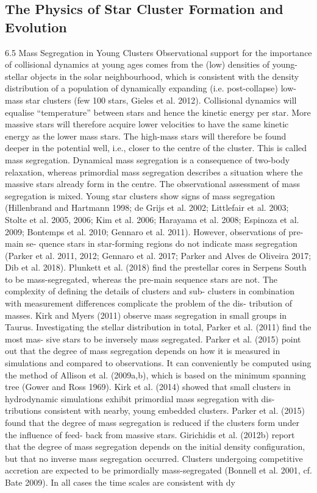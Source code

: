 \documentclass[../Main.tex]{subfiles}
\begin{document}
{\subsection{The Physics of Star Cluster Formation and Evolution}


6.5 Mass Segregation in Young Clusters
Observational support for the importance of collisional dynamics at young ages comes from
the (low) densities of young-stellar objects in the solar neighbourhood, which is consistent
with the density distribution of a population of dynamically expanding (i.e. post-collapse)
low-mass star clusters (few 100 stars, Gieles et al. 2012).
Collisional dynamics will equalise “temperature” between stars and hence the kinetic
energy per star. More massive stars will therefore acquire lower velocities to have the same
kinetic energy as the lower mass stars. The high-mass stars will therefore be found deeper
in the potential well, i.e., closer to the centre of the cluster. This is called mass segregation.
Dynamical mass segregation is a consequence of two-body relaxation, whereas primordial
mass segregation describes a situation where the massive stars already form in the centre.
The observational assessment of mass segregation is mixed. Young star clusters show
signs of mass segregation (Hillenbrand and Hartmann 1998; de Grijs et al. 2002; Littlefair
et al. 2003; Stolte et al. 2005, 2006; Kim et al. 2006; Harayama et al. 2008; Espinoza et al.
2009; Bontemps et al. 2010; Gennaro et al. 2011). However, observations of pre-main se-
quence stars in star-forming regions do not indicate mass segregation (Parker et al. 2011,
2012; Gennaro et al. 2017; Parker and Alves de Oliveira 2017; Dib et al. 2018). Plunkett
et al. (2018) find the prestellar cores in Serpens South to be mass-segregated, whereas the
pre-main sequence stars are not. The complexity of defining the details of clusters and sub-
clusters in combination with measurement differences complicate the problem of the dis-
tribution of masses. Kirk and Myers (2011) observe mass segregation in small groups in
Taurus. Investigating the stellar distribution in total, Parker et al. (2011) find the most mas-
sive stars to be inversely mass segregated.
Parker et al. (2015) point out that the degree of mass segregation depends on how it is
measured in simulations and compared to observations.
It can conveniently be computed using the method of Allison et al. (2009a,b), which is
based on the minimum spanning tree (Gower and Ross 1969). Kirk et al. (2014) showed that
small clusters in hydrodynamic simulations exhibit primordial mass segregation with dis-
tributions consistent with nearby, young embedded clusters. Parker et al. (2015) found that
the degree of mass segregation is reduced if the clusters form under the influence of feed-
back from massive stars. Girichidis et al. (2012b) report that the degree of mass segregation
depends on the initial density configuration, but that no inverse mass segregation occurred.
Clusters undergoing competitive accretion are expected to be primordially mass-segregated
(Bonnell et al. 2001, cf. Bate 2009). In all cases the time scales are consistent with dy

}
\end{document}
